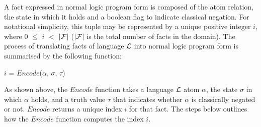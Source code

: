 \documentclass[global,twocolumn,final]{svjour}
\newenvironment{vquote}
  {\begin{list}{}{\leftmargin 1em}\item[]}
  {\end{list}}
\begin{document}
          A fact expressed in normal logic program form is composed of the
          atom relation, the state in which it holds and a boolean flag to
          indicate classical negation. For notational simplicity, this tuple
          may be represented by a unique positive integer $i$, where
          $0$ $\leq$ $i$ $<$ $|{\cal F}|$ ($|{\cal F}|$ is the total
          number of facts in the domain). The process of translating facts of
          language ${\cal L}$ into normal logic program form is summarised by
          the following function:

          \begin{vquote}
            $i$ = $Encode$($\alpha$, $\sigma$, $\tau$)
          \end{vquote}

          As shown above, the $Encode$ function takes a language ${\cal L}$
          atom $\alpha$, the state $\sigma$ in which $\alpha$ holds, and a
          truth value $\tau$ that indicates whether $\alpha$ is classically
          negated or not. $Encode$ returns a unique index $i$ for that
          fact. The steps below outlines how the $Encode$ function computes
          the index $i$.
\end{document}
